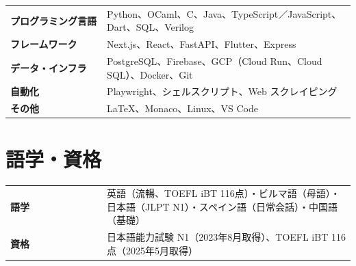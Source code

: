 \documentclass[11pt,a4paper]{article}
\begin{document}
\begin{tabular}{@{}p{0.28\linewidth}@{}p{0.72\linewidth}@{}}
  \textbf{プログラミング言語} & Python、OCaml、C、Java、TypeScript／JavaScript、Dart、SQL、Verilog \\
  \textbf{フレームワーク} & Next.js、React、FastAPI、Flutter、Express \\
  \textbf{データ・インフラ} & PostgreSQL、Firebase、GCP（Cloud Run、Cloud SQL）、Docker、Git \\
  \textbf{自動化} & Playwright、シェルスクリプト、Web スクレイピング \\
  \textbf{その他} & \LaTeX、Monaco、Linux、VS Code \\
\end{tabular}

\section{語学・資格}

\begin{tabular}{@{}p{0.28\linewidth}@{}p{0.72\linewidth}@{}}
  \textbf{語学} & 英語（流暢、TOEFL iBT 116点）・ビルマ語（母語）・日本語（JLPT N1）・スペイン語（日常会話）・中国語（基礎） \\
  \textbf{資格} & 日本語能力試験 N1（2023年8月取得）、TOEFL iBT 116点（2025年5月取得） \\
\end{tabular}
\end{document}

